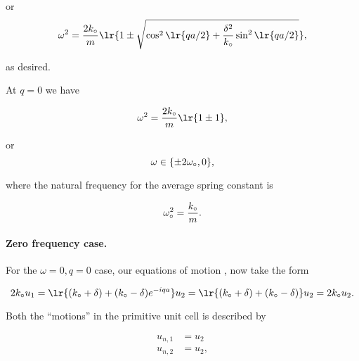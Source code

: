 {or
\begin{dmath}\label{eqn:condensedMatterProblemSet4Problem2:280}
\omega^2 =
\frac{2 k_\nought }{m} \lr{ 1
\pm
\sqrt{
\cos^2 \lr{ q a /2 }
+
\frac{\delta^2}{k_\nought} \sin^2 \lr{ q a /2 }
}
},
\end{dmath}

as desired.


At $q = 0$ we have

\begin{dmath}\label{eqn:condensedMatterProblemSet4Problem2:400}
\omega^2 = \frac{2 k_\nought }{m} \lr{ 1 \pm 1 },
\end{dmath}

or
\begin{dmath}\label{eqn:condensedMatterProblemSet4Problem2:420}
\omega \in \{ \pm 2 \omega_\nought, 0 \},
\end{dmath}

where the natural frequency for the average spring constant is

\begin{dmath}\label{eqn:condensedMatterProblemSet4Problem2:580}
\omega_\nought^2 = \frac{k_\nought}{m}.
\end{dmath}

\paragraph{Zero frequency case.}

For the $\omega = 0, q = 0$ case, our equations of motion
, now take the form

\begin{dmath}\label{eqn:condensedMatterProblemSet4Problem2:440}
2 k_\nought u_1
=
\lr{
 (k_\nought + \delta)
+ (k_\nought - \delta)
e^{ -i q a }
}
u_2
=
\lr{
 (k_\nought + \delta)
+ (k_\nought - \delta)
}
u_2
=
2 k_\nought u_2.
\end{dmath}

Both the ``motions'' in the primitive unit cell is described by

\begin{dmath}\label{eqn:condensedMatterProblemSet4Problem2:620}
\begin{aligned}
u_{n, 1} &= u_2 \\
u_{n, 2} &= u_2,
\end{aligned}
\end{dmath}

}
